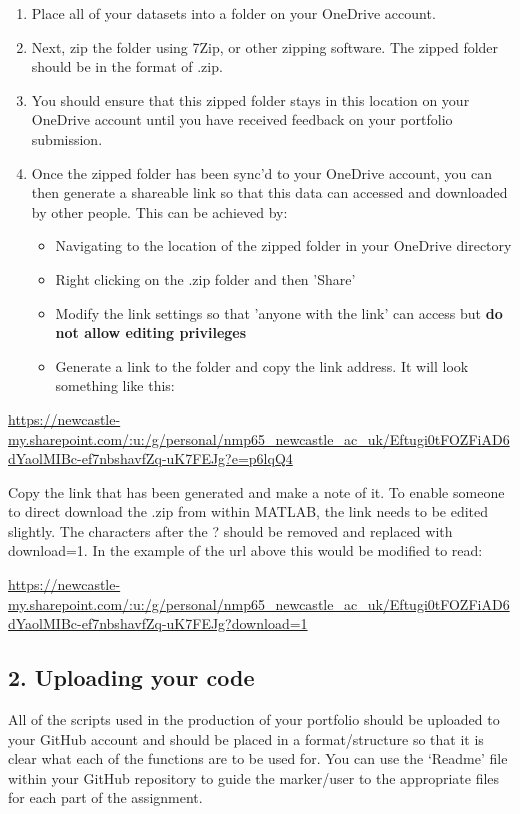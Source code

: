 \documentclass[11pt,onecolumn,a4paper,notitlepage]{article}
\begin{document}
\begin{enumerate}
\item{Place all of your datasets into a folder on your OneDrive account.}
\item{Next, zip the folder using 7Zip, or other zipping software. The zipped folder should be in the format of .zip.}
\item{You should ensure that this zipped folder stays in this location on your OneDrive account until you have received feedback on your portfolio submission.}
\item{Once the zipped folder has been sync'd to your OneDrive account, you can then generate a shareable link so that this data can accessed and downloaded by other people. This can be achieved by:}

\begin{itemize}
\item{Navigating to the location of the zipped folder in your OneDrive directory}
\item{Right clicking on the .zip folder and then 'Share'}
\item{Modify the link settings so that 'anyone with the link' can access but \textbf{do not allow editing privileges}}
\item{Generate a link to the folder and copy the link address. It will look something like this:}
\end{itemize}
\end{enumerate}

\url{https://newcastle-my.sharepoint.com/:u:/g/personal/nmp65_newcastle_ac_uk/Eftugi0tFOZFiAD6dYaolMIBc-ef7nbshavfZq-uK7FEJg?e=p6lqQ4}
\bigskip

\noindent
Copy the link that has been generated and make a note of it. To enable someone to direct download the .zip from within MATLAB, the link needs to be edited slightly. The characters after the ? should be removed and replaced with download=1. In the example of the url above this would be modified to read:

\bigskip
\url{https://newcastle-my.sharepoint.com/:u:/g/personal/nmp65_newcastle_ac_uk/Eftugi0tFOZFiAD6dYaolMIBc-ef7nbshavfZq-uK7FEJg?download=1}

\subsection*{2.	Uploading your code}
\noindent All of the scripts used in the production of your portfolio should be uploaded to your GitHub account and should be placed in a format/structure so that it is clear what each of the functions are to be used for. You can use the `Readme' file within your GitHub repository to guide the marker/user to the appropriate files for each part of the assignment.
\end{document}
